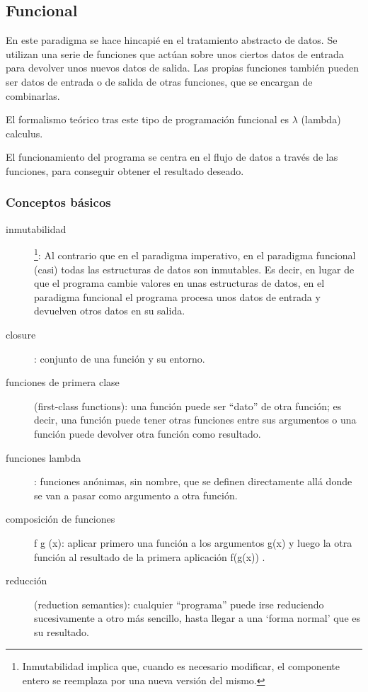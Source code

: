 \documentclass[spanish,12pt,a4paper,final,oneside]{book}
\begin{document}
\subsection{Funcional}
En este paradigma se hace hincapié en el tratamiento abstracto de datos. Se utilizan una serie de funciones que actúan sobre unos ciertos datos de entrada para devolver unos nuevos datos de salida. Las  propias funciones también pueden ser datos de entrada o de salida de otras funciones, que se encargan de combinarlas.

El formalismo teórico tras este tipo de programación funcional es $\lambda$ (lambda) calculus.

El funcionamiento del programa se centra en el flujo de datos a través de las funciones, para conseguir obtener el resultado deseado.

\subsubsection*{Conceptos básicos}

\begin{description}

\item[inmutabilidad]\footnote{Inmutabilidad implica que, cuando es necesario modificar, el componente entero se reemplaza por una nueva versión del mismo.}: Al contrario que en el paradigma imperativo, en el paradigma funcional (casi) todas las estructuras de datos son inmutables. Es decir, en lugar de que el programa cambie valores en unas estructuras de datos, en el paradigma funcional el programa procesa unos datos de entrada y devuelven otros datos en su salida.

\item[closure]: conjunto de una función y su entorno.

\item[funciones de primera clase] (first-class functions): una función puede ser ``dato'' de otra función; es decir, una función puede tener otras funciones entre sus argumentos o una función puede devolver otra función como resultado. 

\item[funciones lambda]: funciones anónimas, sin nombre, que se definen directamente allá donde se van a pasar como argumento a otra función.

\item[composición de funciones] f g (x): aplicar primero una función a los argumentos g(x) y luego la otra función al resultado de la primera aplicación f(g(x)) .

\item[reducción] (reduction semantics): cualquier ``programa'' puede irse reduciendo sucesivamente a otro más sencillo, hasta llegar a una `forma normal' que es su resultado. 

\end{description}
\end{document}
